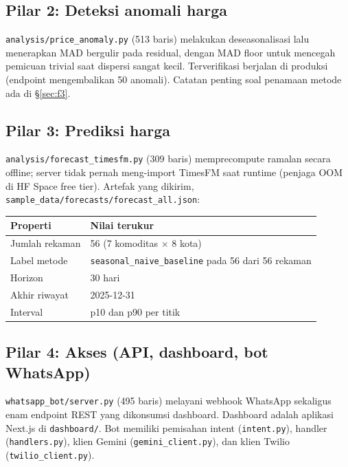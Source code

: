 \documentclass[11pt,a4paper]{article}
\newcommand{\code}[1]{\texttt{\small #1}}
\begin{document}
\subsection{Pilar 2: Deteksi anomali harga}

\code{analysis/price\_anomaly.py} (513 baris) melakukan deseasonalisasi lalu menerapkan MAD
bergulir pada residual, dengan MAD floor untuk mencegah pemicuan trivial saat dispersi sangat
kecil. Terverifikasi berjalan di produksi (endpoint mengembalikan 50 anomali). Catatan penting
soal penamaan metode ada di \S\ref{sec:f3}.

\subsection{Pilar 3: Prediksi harga}

\code{analysis/forecast\_timesfm.py} (309 baris) memprecompute ramalan secara offline; server
tidak pernah meng-import TimesFM saat runtime (penjaga OOM di HF Space free tier). Artefak yang
dikirim, \code{sample\_data/forecasts/forecast\_all.json}:

\begin{center}
\begin{tabular}{@{}p{4.6cm}p{10.4cm}@{}}
\toprule
\textbf{Properti} & \textbf{Nilai terukur} \\
\midrule
Jumlah rekaman & 56 (7 komoditas $\times$ 8 kota) \\
Label metode & \code{seasonal\_naive\_baseline} pada 56 dari 56 rekaman \\
Horizon & 30 hari \\
Akhir riwayat & 2025-12-31 \\
Interval & p10 dan p90 per titik \\
\bottomrule
\end{tabular}
\end{center}

\subsection{Pilar 4: Akses (API, dashboard, bot WhatsApp)}

\code{whatsapp\_bot/server.py} (495 baris) melayani webhook WhatsApp sekaligus enam endpoint REST
yang dikonsumsi dashboard. Dashboard adalah aplikasi Next.js di \code{dashboard/}. Bot memiliki
pemisahan intent (\code{intent.py}), handler (\code{handlers.py}), klien Gemini
(\code{gemini\_client.py}), dan klien Twilio (\code{twilio\_client.py}).
\end{document}

